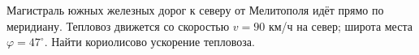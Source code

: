Магистраль южных железных дорог к северу от Мелитополя идёт прямо по
меридиану. Тепловоз движется со скоростью $v=90$ км/ч на север; широта
места $\varphi=47^\circ$. Найти кориолисово ускорение тепловоза.
